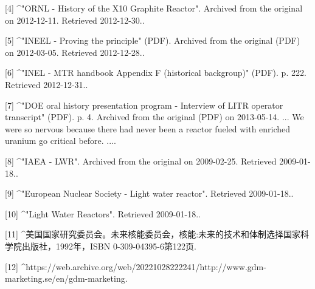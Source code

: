 [4]
^"ORNL - History of the X10 Graphite Reactor". Archived from the original on 2012-12-11. Retrieved 2012-12-30..

[5]
^"INEEL - Proving the principle" (PDF). Archived from the original (PDF) on 2012-03-05. Retrieved 2012-12-28..

[6]
^"INEL - MTR handbook Appendix F (historical backgroup)" (PDF). p. 222. Retrieved 2012-12-31..

[7]
^"DOE oral history presentation program - Interview of LITR operator transcript" (PDF). p. 4. Archived from the original (PDF) on 2013-05-14. ... We were so nervous because there had never been a reactor fueled with enriched uranium go critical before. ....

[8]
^"IAEA - LWR". Archived from the original on 2009-02-25. Retrieved 2009-01-18..

[9]
^"European Nuclear Society - Light water reactor". Retrieved 2009-01-18..

[10]
^"Light Water Reactors". Retrieved 2009-01-18..

[11]
^美国国家研究委员会。未来核能委员会，核能:未来的技术和体制选择国家科学院出版社，1992年，ISBN 0-309-04395-6第122页.

[12]
^https://web.archive.org/web/20221028222241/http://www.gdm-marketing.se/en/gdm-marketing.
